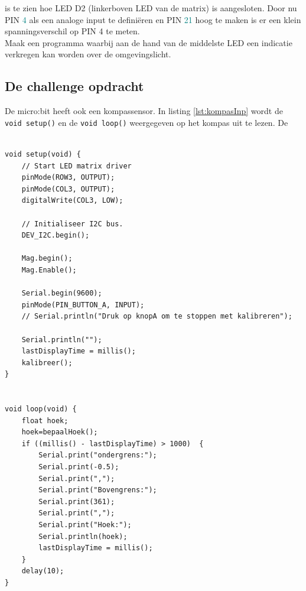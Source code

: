 \begin{enumerate}
\begin{figure}[h!]
	\end{figure}
	
	is te zien hoe LED D2 (linkerboven LED van de matrix) is aangesloten. Door nu PIN \textcolor{teal}{4} als een analoge input te definiëren en PIN \textcolor{teal}{21} hoog te maken is er een klein spanningsverschil op PIN 4 te meten.\\
	
    Maak een programma waarbij aan de hand van de middelste LED een indicatie verkregen kan worden over de omgevingslicht.
   
   \subsection{De challenge opdracht}
   
   De micro:bit heeft ook een kompassensor. In listing \ref{lst:kompasInp} wordt de \lstinline|void setup()| en de  \lstinline|void loop()| weergegeven op het kompas uit te lezen. De 
   	\begin{lstlisting}[numbers=none ,caption= De micro:bit als een kompas,label={lst:kompasInp}]
   		
void setup(void) {
	// Start LED matrix driver
	pinMode(ROW3, OUTPUT);
	pinMode(COL3, OUTPUT);
	digitalWrite(COL3, LOW);
	
	// Initialiseer I2C bus.
	DEV_I2C.begin();
	
	Mag.begin();
	Mag.Enable();
	
	Serial.begin(9600);
	pinMode(PIN_BUTTON_A, INPUT);
	// Serial.println("Druk op knopA om te stoppen met kalibreren");
	
	Serial.println("");
	lastDisplayTime = millis();
	kalibreer();
}

   		
void loop(void) {
	float hoek;
	hoek=bepaalHoek();
	if ((millis() - lastDisplayTime) > 1000)  {
		Serial.print("ondergrens:");
		Serial.print(-0.5);
		Serial.print(",");
		Serial.print("Bovengrens:");
		Serial.print(361);
		Serial.print(",");
		Serial.print("Hoek:");
		Serial.println(hoek);
		lastDisplayTime = millis();
	}
	delay(10);
}
   		
   		
\end{lstlisting}
   
   
\end{enumerate}
	

	
	
